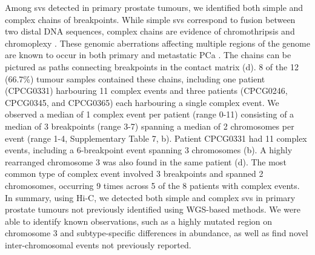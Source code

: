 
Among \glspl{sv} detected in primary prostate tumours, we identified both simple and complex chains of breakpoints.
While simple \glspl{sv} correspond to fusion between two distal DNA sequences, complex chains are evidence of chromothripsis and chromoplexy \cite{bacaPunctuatedEvolutionProstate2013}.
These genomic aberrations affecting multiple regions of the genome are known to occur in both primary and metastatic PCa \cite{bacaPunctuatedEvolutionProstate2013,fraserGenomicHallmarksLocalized2017,liPatternsSomaticStructural2020}.
The chains can be pictured as paths connecting breakpoints in the contact matrix (d).
8 of the 12 (66.7\%) tumour samples contained these chains, including one patient (CPCG0331) harbouring 11 complex events and three patients (CPCG0246, CPCG0345, and CPCG0365) each harbouring a single complex event.
We observed a median of 1 complex event per patient (range 0-11) consisting of a median of 3 breakpoints (range 3-7) spanning a median of 2 chromosomes per event (range 1-4, Supplementary Table 7, b).
Patient CPCG0331 had 11 complex events, including a 6-breakpoint event spanning 3 chromosomes (b).
A highly rearranged chromosome 3 was also found in the same patient (d).
The most common type of complex event involved 3 breakpoints and spanned 2 chromosomes, occurring 9 times across 5 of the 8 patients with complex events.
In summary, using Hi-C, we detected both simple and complex \glspl{sv} in primary prostate tumours not previously identified using WGS-based methods.
We were able to identify known observations, such as a highly mutated region on chromosome 3 and subtype-specific differences in abundance, as well as find novel inter-chromosomal events not previously reported.

